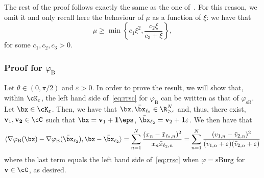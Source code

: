 \documentclass[11pt]{amsart}
\newcommand{\es}[1]{{\color{blue}#1}}
\begin{document}
The rest of the proof follows exactly the same as the one of~\cite[Theorem 2.7]{chirinos2025}. For this reason, we omit it and only recall here the behaviour of $\mu$ as a function of $\xi$: we have that
\begin{equation}\label{eq:mu_estimate}
    \mu \geq \min \left\lbrace c_1 \xi^2, \frac{c_2\xi}{c_3 + \xi} \right\rbrace,
\end{equation}
for some $c_1,c_2,c_3>0$. 


\subsubsection{\texorpdfstring{Proof for $\varphi_{\mathrm{B}}$}{Burg's entropy varphiB}}
Let $\theta\in(0,\pi/2)$ and $\varepsilon>0$. In order to prove the result, we will show that, within $\cK_\varepsilon$, the left hand side of~\cref{eq:rrsc} for $\varphi_{\mathrm{B}}$ can be written as that of $\varphi_{\mathrm{sB}}$. Let $\bx\in\cK_\varepsilon$. Then, we have that $\bx, \bar \bx_{\ell_2} \in \R_{\geq \varepsilon}^N$ and, thus, there exist, $\mathbf{v}_1,\mathbf{v_2}\in\cC$ such that $\bx=\mathbf{v}_1+\mathbf{1}\eps$,  $\bar \bx_{\ell_2} = \mathbf{v}_2 + \mathbf{1}\varepsilon$. We then have that
$$
\begin{aligned}
\langle \nabla \varphi_\mathrm{B}(\bx) -\nabla \varphi_\mathrm{B}(\bar\bx_{\ell_2}),\bx-\bar\bx_{\ell_2} \rangle=
\sum_{n=1}^N\frac{(x_{n}-\bar x_{\ell_2,n})^2}{x_n \bar x_{\ell_2,n}}=
\sum_{n=1}^N\frac{(v_{1,n}-\bar v_{2,n})^2}{(v_{1,n}+\varepsilon)(\bar v_{2,n}+\varepsilon)}
\end{aligned}
$$
where the last term equals the left hand side of~\cref{eq:rrsc} when $\varphi=\mathrm{sBurg}$ for $\mathbf{v}\in\cC$, as desired.
\end{document}
